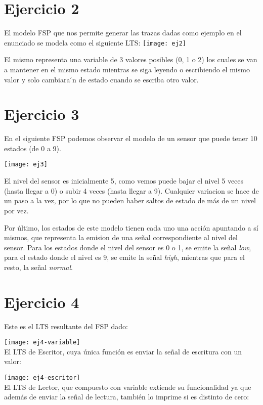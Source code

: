 \setcounter{section}{1}
\section{Ejercicio 2}
El modelo FSP que nos permite generar las trazas dadas como ejemplo en el enunciado se modela como el
siguiente LTS:
\texttt{[image: ej2]}

El mismo representa una variable de 3 valores posibles (0, 1 o 2) los cuales se van a mantener en el mismo estado mientras se siga leyendo o escribiendo el mismo valor y solo cambiara ́n de estado cuando se escriba otro valor.

\section{Ejercicio 3}
En el siguiente FSP podemos observar el modelo de un sensor que puede tener 10 estados (de 0 a 9).

\texttt{[image: ej3]}

El nivel del sensor es inicialmente 5, como vemos puede bajar el nivel 5 veces (hasta llegar a 0) o subir 4 veces (hasta llegar a 9). Cualquier variacion se hace de un paso a la vez, por lo que no pueden haber saltos de estado de más de un nivel por vez.

Por último, los estados de este modelo tienen cada uno una acción apuntando a sí mismos, que representa la emision de una señal correspondiente al nivel del sensor. Para los estados donde el nivel del sensor es 0 o 1, se emite la señal \textit{low}, para el estado donde el nivel es 9, se emite la señal \textit{high}, mientras que para el resto, la señal \textit{normal}.

\section{Ejercicio 4}
Este es el LTS resultante del FSP dado:

\texttt{[image: ej4-variable]} \\

El LTS de Escritor, cuya única función es enviar la señal de escritura con un valor:

\texttt{[image: ej4-escritor]} \\

El LTS de Lector, que compuesto con variable extiende su funcionalidad ya que además de enviar la señal de lectura, también lo imprime si es distinto de cero:

